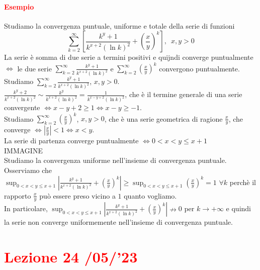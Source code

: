 \documentclass{article}
\begin{document}
\paragraph{\textcolor{red}{Esempio}}
Studiamo la convergenza puntuale, uniforme e totale della serie di funzioni \begin{equation*}
    \sum_{k=2}^{\infty}\left[\frac{k^y+1}{k^{x+2}(\ln k)^2} +\left( \frac{x}{y} \right)^k\right], \,\,\, x,y >0
\end{equation*} 
La serie è somma di due serie a termini positivi e quijndi converge puntualmente $\Leftrightarrow$ le due serie $\sum_{k=2}^{\infty} \frac{k^y+1}{k^{x+2}(\ln k)^2}$ e $\sum_{k=2}^{\infty}  \left( \frac{x}{y} \right)^k$ convergono puntualmente.\\
Studiamo $\sum_{k=2}^{\infty} \frac{k^y+1}{k^{x+2}(\ln k)^2}$, $x,y >0$.\\
$\frac{k^y+2}{k^{x+2}(\ln k)^2} \sim \frac{k^y}{k^{x+2}(\ln k)^2}=\frac{1}{k^{x-y+2}(\ln k)^2}$, che è il termine generale di una serie convergente $\Leftrightarrow x-y+2 \geq 1 \Leftrightarrow x-y \geq -1$.\\
Studiamo $\sum_{k=2}^{\infty} \left(\frac{x}{y}\right)^k$, $x,y>0$, che è una serie geometrica di ragione $\frac{x}{y}$, che converge $\Leftrightarrow |\frac{x}{y}|< 1 \Leftrightarrow x <y$.\\
La serie di partenza converge puntualmente $\Leftrightarrow 0<x<y\leq x+1$\\
IMMAGINE\\
Studiamo la convergenza uniforme nell'insieme di convergenza puntuale.\\
Osserviamo che $\sup_{0<x< y\leq x+1}|\frac{k^y+1}{k^{x+2}(\ln k)^2}+\left( \frac{x}{y}\right)^k|\geq  \sup_{0<x< y\leq x+1} \left( \frac{x}{y}\right)^k=1\,\, \forall k$ perchè il rapporto $\frac{x}{y}$ può essere preso vicino a $1$ quanto vogliamo.\\
In particolare, $\sup_{0<x< y\leq x+1}|\frac{k^y+1}{k^{x+2}(\ln k)^2}+\left( \frac{x}{y}\right)^k|\nrightarrow 0$ per $k \rightarrow +\infty$ e quindi la serie non converge uniformemente nell'insieme di convergenza puntuale.

\newpage
\section{\textcolor{red}{Lezione 24 \space{}/05/'23}}
\end{document}
